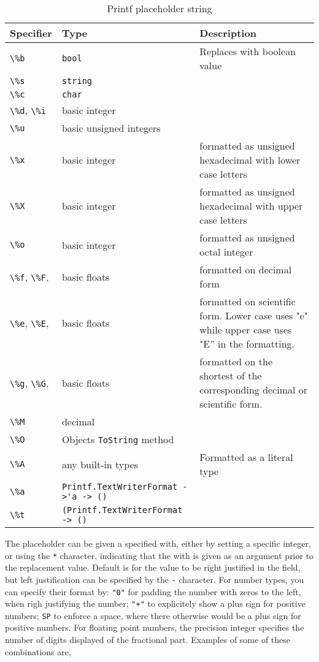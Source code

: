 \begin{table}
  \centering
  \begin{tabularx}{\linewidth}{|l|l|X|}
    \hline
    \rowcolor{headerRowColor} Specifier& Type&Description\\
    \hline
    \lstinline!\%b!&\lstinline!bool!&Replaces with boolean value\\
    \hline
    \lstinline!\%s!&\lstinline!string!&\\
    \hline
    \lstinline!\%c!&\lstinline!char!&\\
    \hline
    \mbox{\lstinline!\%d!,} \mbox{\lstinline!\%i!}&basic integer&\\
    \hline
    \lstinline!\%u!&basic unsigned integers&\\
    \hline
    \lstinline!\%x!&basic integer&formatted as unsigned hexadecimal with lower case letters\\
    \hline
    \lstinline!\%X!&basic integer&formatted as unsigned hexadecimal with upper case letters\\
    \hline
    \lstinline!\%o!&basic integer&formatted as unsigned octal integer\\
    \hline
    \mbox{\lstinline!\%f!,} \mbox{\lstinline!\%F!,} &basic floats&formatted on decimal form\\
    \hline
    \mbox{\lstinline!\%e!,} \mbox{\lstinline!\%E!,} &basic floats&formatted on scientific form. Lower case uses "e" while upper case uses "E'' in the formatting.\\
    \hline
    \mbox{\lstinline!\%g!,} \mbox{\lstinline!\%G!,} &basic floats&formatted on the shortest of the corresponding decimal or scientific form.\\
    \hline
    \lstinline!\%M!&decimal&\\
    \hline
    \lstinline!\%O!&Objects \lstinline!ToString! method&\\
    \hline
    \lstinline!\%A!&any built-in types&Formatted as a literal type\\
    \hline
    \lstinline!\%a!&\lstinline[language=ebnf]!Printf.TextWriterFormat ->'a -> ()!&\\
    \hline
    \lstinline!\%t!&\lstinline[language=ebnf]!(Printf.TextWriterFormat -> ()!&\\
    \hline
  \end{tabularx}
  \caption{Printf placeholder string}
  \label{tab:printfPlaceholder}
\end{table}
The placeholder can be given a specified with, either by setting a specific integer, or using the \lstinline!*! character, indicating that the with is given as an argument prior to the replacement value. Default is for the value to be right justified in the field, but left justification can be specified by the \lstinline!-! character. For number types, you can specify their format by: \lstinline!"0"! for padding the number with zeros to the left, when righ justifying the number; \lstinline!"+"! to explicitely show a plus sign for positive numbers; \lstinline!SP! to enforce a space, where there otherwise would be a plus sign for positive numbers. For floating point numbers, the precision integer specifies the number of digits displayed of the fractional part. Examples of some of these combinations are,
